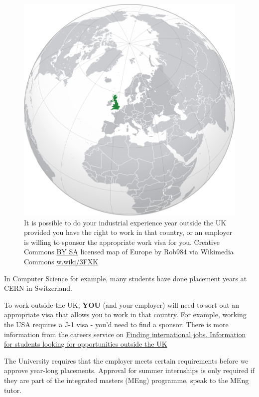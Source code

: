 \documentclass[
]{book}
\begin{document}
\begin{figure}

{\centering \includegraphics[width=0.9\linewidth]{images/outsideuk} 

}

\caption{It is possible to do your industrial experience year outside the UK provided you have the right to work in that country, or an employer is willing to sponsor the appropriate work visa for you. Creative Commons \href{https://creativecommons.org/licenses/by-sa/4.0/deed.en}{BY SA} licensed map of Europe by Rob984 via Wikimedia Commons \href{https://w.wiki/3FXK}{w.wiki/3FXK}}\label{fig:notuk-fig}
\end{figure}



In Computer Science for example, many students have done placement years at CERN in Switzerland. \citep{cern}

To work outside the UK, \textbf{YOU} (and your employer) will need to sort out an appropriate visa that allows you to work in that country. For example, working the USA requires a J-1 visa - you'd need to find a sponsor. There is more information from the careers service on \href{https://www.careers.manchester.ac.uk/international/internationaljobs/}{Finding international jobs. Information for students looking for opportunities outside the UK} \citep{interjobs}

The University requires that the employer meets certain requirements before we approve year-long placements. Approval for summer internships is only required if they are part of the integrated masters (MEng) programme, speak to the MEng tutor.
\end{document}
